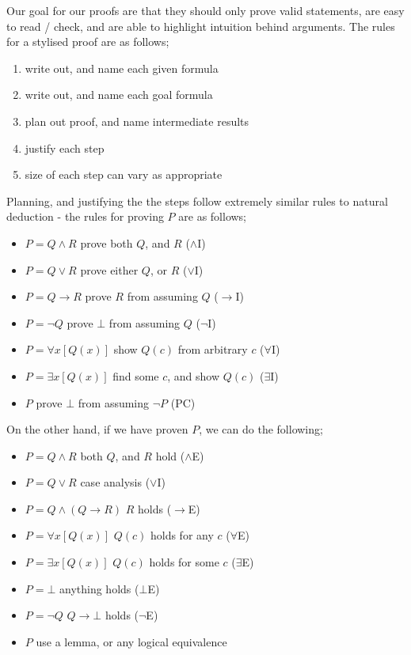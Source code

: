 \documentclass[a4paper, 12pt]{article}
\begin{document}
                Our goal for our proofs are that they should only prove valid statements, are easy to read / check, and are able to highlight intuition behind arguments. The rules for a stylised proof are as follows;
                \begin{enumerate}[1.]
                    \itemsep0em
                    \item write out, and name each given formula
                    \item write out, and name each goal formula
                    \item plan out proof, and name intermediate results
                    \item justify each step
                    \item size of each step can vary as appropriate
                \end{enumerate}
                Planning, and justifying the the steps follow extremely similar rules to natural deduction - the rules for proving $P$ are as follows;
                \begin{itemize}
                    \itemsep0em
                    \item $P = Q \land R$ \hfill prove both $Q$, and $R$ ($\land$I)
                    \item $P = Q \lor R$ \hfill prove either $Q$, or $R$ ($\lor$I)
                    \item $P = Q \rightarrow R$ \hfill prove $R$ from assuming $Q$ ($\rightarrow$I)
                    \item $P = \neg Q$ \hfill prove $\bot$ from assuming $Q$ ($\neg$I)
                    \item $P = \forall x [Q(x)]$ \hfill show $Q(c)$ from arbitrary $c$ ($\forall$I)
                    \item $P = \exists x [Q(x)]$ \hfill find some $c$, and show $Q(c)$ ($\exists$I)
                    \item $P$ \hfill prove $\bot$ from assuming $\neg P$ (PC)
                \end{itemize}
                On the other hand, if we have proven $P$, we can do the following;
                \begin{itemize}
                    \itemsep0em
                    \item $P = Q \land R$ \hfill both $Q$, and $R$ hold ($\land$E)
                    \item $P = Q \lor R$ \hfill case analysis ($\lor$I)
                    \item $P = Q \land (Q \rightarrow R)$ \hfill $R$ holds ($\rightarrow$E)
                    \item $P = \forall x [Q(x)]$ \hfill $Q(c)$ holds for any $c$ ($\forall$E)
                    \item $P = \exists x [Q(x)]$ \hfill $Q(c)$ holds for some $c$ ($\exists$E)
                    \item $P = \bot$ \hfill anything holds ($\bot$E)
                    \item $P = \neg Q$ \hfill $Q \rightarrow \bot$ holds ($\neg$E)
                    \item $P$ \hfill use a lemma, or any logical equivalence
                \end{itemize}
\end{document}
